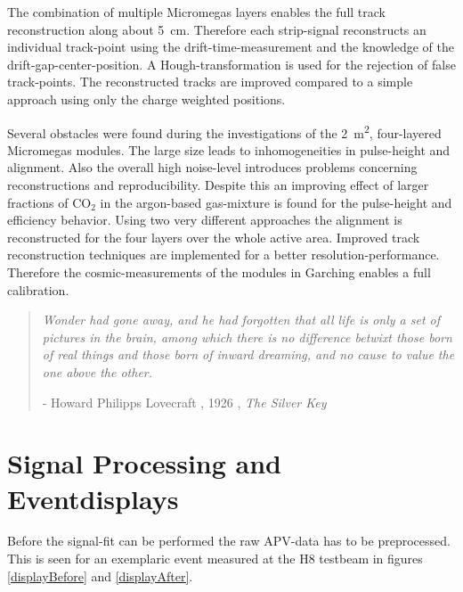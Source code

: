 \documentclass[
twoside,            %
BCOR1.4cm,          %
10pt,               %
headings=normal,    %
headsepline,        %
clearplainpage,		%
final,              %
div=14,
open=right,
bibliography=toc
]{scrreprt}
\begin{document}
The combination of multiple Micromegas layers enables the full track reconstruction along about \SI{5}{cm}.
Therefore each strip-signal reconstructs an individual track-point using the drift-time-measurement and the knowledge of the drift-gap-center-position.
A Hough-transformation is used for the rejection of false track-points.
The reconstructed tracks are improved compared to a simple approach using only the charge weighted positions.

Several obstacles were found during the investigations of the \SI{2}{\square\m}, four-layered Micromegas modules.
The large size leads to inhomogeneities in pulse-height and alignment.
Also the overall high noise-level introduces problems concerning reconstructions and reproducibility.
Despite this an improving effect of larger fractions of CO$_2$ in the argon-based gas-mixture is found for the pulse-height and efficiency behavior.
Using two very different approaches the alignment is reconstructed for the four layers over the whole active area.
Improved track reconstruction techniques are implemented for a better resolution-performance.
Therefore the cosmic-measurements of the modules in Garching enables a full calibration.

\vspace*{\fill} 
\begin{quote} 
	\textit{
		Wonder had gone away, and he had forgotten that all life is only a set of pictures in the brain, among which there is no difference betwixt those born of real things and those born of inward dreaming, and no cause to value the one above the other.
	}
	
	\hfill - Howard Philipps Lovecraft , 1926 , \textit{The Silver Key}
\end{quote}
\vspace*{\fill}

\appendix

\chapter{Signal Processing and Eventdisplays}

Before the signal-fit can be performed the raw APV-data has to be preprocessed.
This is seen for an exemplaric event measured at the H8 testbeam in figures \ref{displayBefore} and \ref{displayAfter}.
\end{document}
